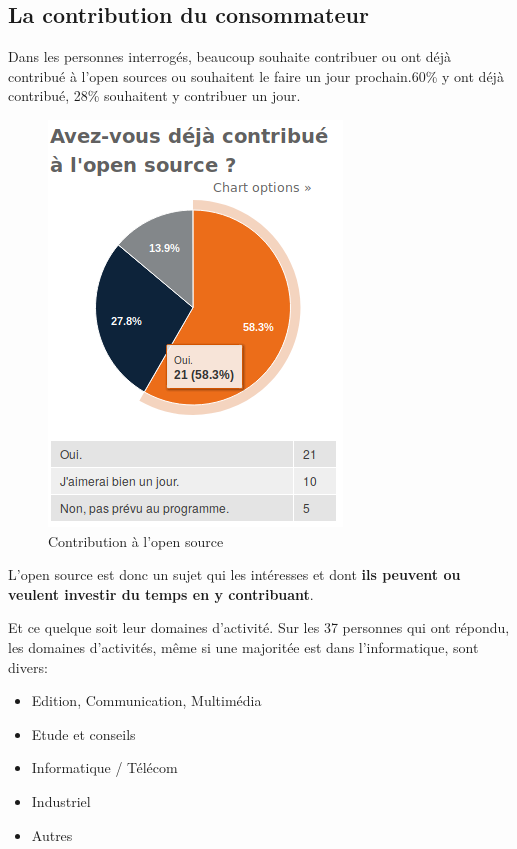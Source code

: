 		\subsection{La contribution du consommateur}

			Dans les personnes interrogés, beaucoup souhaite contribuer ou ont déjà contribué à l'open sources ou souhaitent le faire un jour prochain.60\% y ont déjà contribué, 28\% souhaitent y contribuer un jour.

			\begin{figure}[ht]
				\center
				\includegraphics[scale=0.58]{./img/a4}
				\caption{Contribution à l'open source}
			\end{figure}

			L'open source est donc un sujet qui les intéresses et dont \textbf{ils peuvent ou veulent investir du temps en y contribuant}.

			Et ce quelque soit leur domaines d'activité. Sur les 37 personnes qui ont répondu, les domaines d'activités, même si une majoritée est dans l'informatique, sont divers:

			\begin{itemize}[label=\textbullet, font=\LARGE \color{burntorange}]
				\item Edition, Communication, Multimédia
				\item Etude et conseils
				\item Informatique / Télécom
				\item Industriel
				\item Autres
			\end{itemize}

